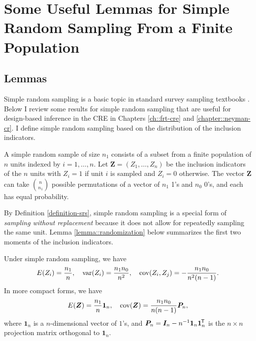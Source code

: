 
\chapter{Some Useful Lemmas for Simple Random Sampling From a Finite Population}
 \label{chapter::SRS-appendix}

\section{Lemmas}
 
Simple random sampling is a basic topic in standard survey sampling textbooks \citep[e.g.,][]{cochran1953}. Below I review some results for simple random sampling that are useful for design-based inference in the CRE in Chapters \ref{ch::frt-cre} and \ref{chapter::neyman-cr}. I define simple random sampling based on the distribution of the inclusion indicators. 


\begin{definition}
\label{definition-srs}
A simple random sample of size $n_1$ consists of a subset from a finite population of $n$ units indexed by $i=1,\ldots, n$. 
Let $\boldsymbol{Z} = (Z_1, \ldots, Z_n)$ be the inclusion indicators of the $n$ units with $Z_i=1$ if unit $i$ is sampled and $Z_i=0$ otherwise.
The vector $\boldsymbol{Z}$ can take $\binom{n}{n_1}$ possible permutations of a vector of $n_1$ 1's and $n_0$ 0's, and each has equal probability.
\end{definition}

By Definition \ref{definition-srs}, simple random sampling is a special form of {\it sampling without replacement} because it does not allow for repeatedly sampling the same unit. Lemma \ref{lemma::randomization} below summarizes the first two moments of the inclusion indicators. 

 

\begin{lemma}
\label{lemma::randomization}
Under simple random sampling, we have 
$$
E ( Z_i )  = \frac{n_1}{ n}, \quad 
\textup{var}(Z_i) = \frac{  n_1 n_0 }{n^2}, \quad 
\textup{cov}(Z_i, Z_j) = - \frac{n_1 n_0 } { n^2 (n-1)  }.
$$ 
In more compact forms, we have 
$$
E(\boldsymbol{Z}) = \frac{n_1}{n} \boldsymbol{1}_n,\quad
\textup{cov}(\boldsymbol{Z}) = \frac{n_1n_0}{n(n-1)} \boldsymbol{P}_n,
$$
where $ \boldsymbol{1}_n$ is a $n$-dimensional vector of $1$'s, and $\boldsymbol{P}_n = \boldsymbol{I}_n  - n^{-1} \boldsymbol{1}_n \boldsymbol{1}_n^{\mkern-1.5mu\mathsf{T}} $ is the $n\times n$ projection matrix orthogonal to $ \boldsymbol{1}_n.$
\end{lemma}




